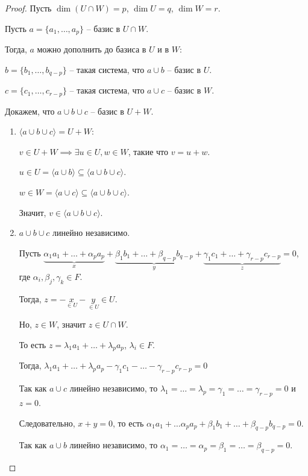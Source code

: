 \begin{proof}
    Пусть $\dim (U \cap W) = p$, $\dim U = q$, $\dim W = r$.

    Пусть $a = \{a_1, \dots, a_p\}$ -- базис в $U \cap W$.

    Тогда, $a$ можно дополнить до базиса в $U$ и в $W$:

    $b = \{b_1, \dots, b_{q - p}\}$ -- такая система, что $a \cup b$ -- базис в $U$.

    $c = \{c_1, \dots, c_{r - p}\}$ -- такая система, что $a \cup c$ -- базис в $W$.

    \bigskip
    Докажем, что $a \cup b \cup c$ -- базис в $U + W$.
    \begin{enumerate}
    \item 
        $\langle a \cup b \cup c \rangle = U + W$:

        $v \in U + W \implies \exists u \in U, w \in W$, такие что $v = u + w$.

        $u \in U = \langle a \cup b \rangle \subseteq \langle a \cup b \cup c \rangle$.

        $w \in W = \langle a \cup c \rangle \subseteq \langle a \cup b \cup c \rangle$.

        Значит, $v \in \langle a \cup b \cup c \rangle$.

    \item
        $a \cup b \cup c$ линейно независимо.

        Пусть $\underbrace{\alpha_1 a_1 + \dots + \alpha_p a_p}_x + \underbrace{\beta_1 b_1 + \dots + \beta_{q - p} b_{q - p}}_y + \underbrace{\gamma_1 c_1 + \dots + \gamma_{r - p} c_{r - p}}_z = 0$, где $\alpha_i, \beta_j, \gamma_k \in F$.

        Тогда, $z = -\underset{\in U}{x} - \underset{\in U}{y} \in U$.

        Но, $z \in W$, значит $z \in U \cap W$. 

        То есть $z = \lambda_1 a_1 + \dots + \lambda_p a_p$, $\lambda_i \in F$.

        Тогда, $\lambda_1 a_1 + \dots + \lambda_p a_p - \gamma_1 c_1 - \dots - \gamma_{r - p} c_{r - p} = 0$

        Так как $a \cup c$ линейно независимо, то $\lambda_1 = \dots = \lambda_p = \gamma_1 = \dots = \gamma_{r - p} = 0$ и $z = 0$.

        Следовательно, $x + y = 0$, то есть $\alpha_1 a_1 + \dots \alpha_p a_p + \beta_1 b_1 + \dots + \beta_{q - p} b_{q - p} = 0$.

        Так как $a \cup b$ линейно независимо, то $\alpha_1 = \dots = \alpha_p = \beta_1 = \dots = \beta_{q - p} = 0$.


\end{enumerate}
\end{proof}
